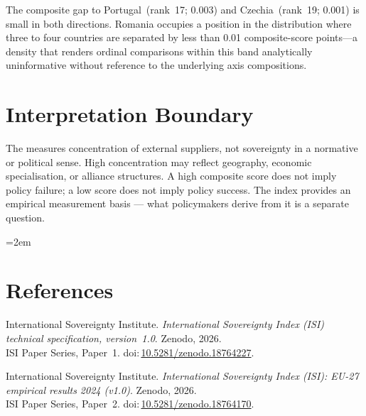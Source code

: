 \documentclass[12pt,a4paper]{article}
\begin{document}
The composite gap to Portugal~(rank~17; 0.003) and Czechia~(rank~19; 0.001) is small in both directions.  Romania occupies a position in the distribution where three to four countries are separated by less than 0.01 composite-score points---a density that renders ordinal comparisons within this band analytically uninformative without reference to the underlying axis compositions.


\section{Interpretation Boundary}
\label{sec:interpretation}

The \ISI measures concentration of external suppliers, not sovereignty in a normative or political sense.  High concentration may reflect geography, economic specialisation, or alliance structures.  A high composite score does not imply policy failure; a low score does not imply policy success.  The index provides an empirical measurement basis --- what policymakers derive from it is a separate question.


\clearpage
\vspace*{1.5cm}

\begingroup\emergencystretch=2em
\section*{References}

\begin{enumerate}[label={[\arabic*]},leftmargin=2em,itemsep=6pt]
\item International Sovereignty Institute.
  \textit{International Sovereignty Index (ISI) technical specification, version~1.0}.
  Zenodo, 2026.\\ISI Paper Series, Paper~1.
  doi:\,\href{https://doi.org/10.5281/zenodo.18764227}{10.5281/zenodo.18764227}.

\item International Sovereignty Institute.
  \textit{International Sovereignty Index (ISI): EU-27 empirical results 2024 (v1.0)}.
  Zenodo, 2026.\\ISI Paper Series, Paper~2.
  doi:\,\href{https://doi.org/10.5281/zenodo.18764170}{10.5281/zenodo.18764170}.
\end{enumerate}
\endgroup
\end{document}
